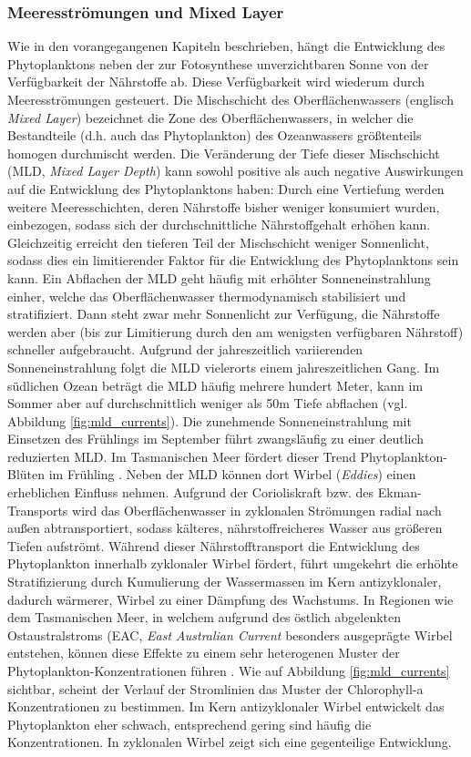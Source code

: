 \documentclass[12pt,a4paper,onecolumn,headheight=30pt]{scrartcl}
\begin{document}
\subsubsection{Meeresströmungen und Mixed Layer}
Wie in den vorangegangenen Kapiteln beschrieben, hängt die Entwicklung des Phytoplanktons neben der zur Fotosynthese unverzichtbaren Sonne von der Verfügbarkeit der Nährstoffe ab. Diese Verfügbarkeit wird wiederum durch Meeresströmungen gesteuert. Die Mischschicht des Oberflächenwassers (englisch \textit{Mixed Layer}) bezeichnet die Zone des Oberflächenwassers, in welcher die Bestandteile (d.h. auch das Phytoplankton) des Ozeanwassers größtenteils homogen durchmischt werden. Die Veränderung der Tiefe dieser Mischschicht (MLD, \textit{Mixed Layer Depth}) kann sowohl positive als auch negative Auswirkungen auf die Entwicklung des Phytoplanktons haben: Durch eine Vertiefung werden weitere Meeresschichten, deren Nährstoffe bisher weniger konsumiert wurden, einbezogen, sodass sich der durchschnittliche Nährstoffgehalt erhöhen kann. Gleichzeitig erreicht den tieferen Teil der Mischschicht weniger Sonnenlicht, sodass dies ein limitierender Faktor für die Entwicklung des Phytoplanktons sein kann. Ein Abflachen der MLD geht häufig mit erhöhter Sonneneinstrahlung einher, welche das Oberflächenwasser thermodynamisch stabilisiert und stratifiziert. Dann steht zwar mehr Sonnenlicht zur Verfügung, die Nährstoffe werden aber (bis zur Limitierung durch den am wenigsten verfügbaren Nährstoff) schneller aufgebraucht. Aufgrund der jahreszeitlich variierenden Sonneneinstrahlung folgt die MLD vielerorts einem jahreszeitlichen Gang. Im südlichen Ozean beträgt die MLD häufig mehrere hundert Meter, kann im Sommer aber auf durchschnittlich weniger als 50m Tiefe abflachen (vgl. Abbildung \ref{fig:mld_currents}). Die zunehmende Sonneneinstrahlung mit Einsetzen des Frühlings im September führt zwangsläufig zu einer deutlich reduzierten MLD. Im Tasmanischen Meer fördert dieser Trend Phytoplankton-Blüten im Frühling \citep{Tilburg.2002}. Neben der MLD können dort Wirbel (\textit{Eddies}) einen erheblichen Einfluss nehmen. Aufgrund der Corioliskraft bzw. des Ekman-Transports wird das Oberflächenwasser in zyklonalen Strömungen radial nach außen abtransportiert, sodass kälteres, nährstoffreicheres Wasser aus größeren Tiefen aufströmt. Während dieser Nährstofftransport die Entwicklung des Phytoplankton innerhalb zyklonaler Wirbel fördert, führt umgekehrt die erhöhte Stratifizierung durch Kumulierung der Wassermassen im Kern antizyklonaler, dadurch wärmerer, Wirbel zu einer Dämpfung des Wachstums. In Regionen wie dem Tasmanischen Meer, in welchem aufgrund des östlich abgelenkten Ostaustralstroms (EAC, \textit{East Australian Current} besonders ausgeprägte Wirbel entstehen, können diese Effekte zu einem sehr heterogenen Muster der Phytoplankton-Konzentrationen führen \citep{Tilburg.2002}. Wie auf Abbildung \ref{fig:mld_currents} sichtbar, scheint der Verlauf der Stromlinien das Muster der Chlorophyll-a Konzentrationen zu bestimmen. Im Kern antizyklonaler Wirbel entwickelt das Phytoplankton eher schwach, entsprechend gering sind häufig die Konzentrationen. In zyklonalen Wirbel zeigt sich eine gegenteilige Entwicklung.
\end{document}

